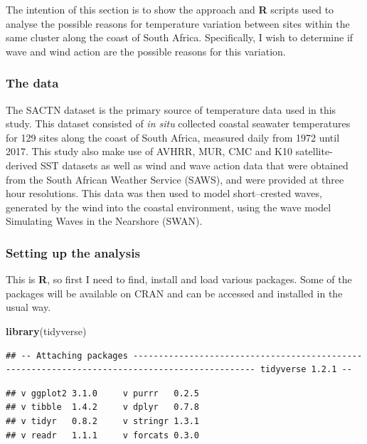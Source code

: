 \documentclass[10pt,A4,]{article}
\newenvironment{Shaded}{\begin{snugshade}}{\end{snugshade}}
\newcommand{\KeywordTok}[1]{\textcolor[rgb]{0.13,0.29,0.53}{\textbf{#1}}}
\newcommand{\NormalTok}[1]{#1}
\begin{document}
The intention of this section is to show the approach and \textbf{R}
scripts used to analyse the possible reasons for temperature variation
between sites within the same cluster along the coast of South Africa.
Specifically, I wish to determine if wave and wind action are the
possible reasons for this variation.

\subsubsection*{The data}

The SACTN dataset is the primary source of temperature data used in this
study. This dataset consisted of \emph{in situ} collected coastal
seawater temperatures for 129 sites along the coast of South Africa,
measured daily from 1972 until 2017. This study also make use of AVHRR,
MUR, CMC and K10 satellite-derived SST datasets as well as wind and wave
action data that were obtained from the South African Weather Service
(SAWS), and were provided at three hour resolutions. This data was then
used to model short--crested waves, generated by the wind into the
coastal environment, using the wave model Simulating Waves in the
Nearshore (SWAN).

\subsubsection*{Setting up the analysis}

This is \textbf{R}, so first I need to find, install and load various
packages. Some of the packages will be available on CRAN and can be
accessed and installed in the usual way.

\begin{Shaded}
\begin{Highlighting}[]
\KeywordTok{library}\NormalTok{(tidyverse)}
\end{Highlighting}
\end{Shaded}

\begin{verbatim}
## -- Attaching packages ---------------------------------------------------------------------------------------------- tidyverse 1.2.1 --
\end{verbatim}

\begin{verbatim}
## v ggplot2 3.1.0     v purrr   0.2.5
## v tibble  1.4.2     v dplyr   0.7.8
## v tidyr   0.8.2     v stringr 1.3.1
## v readr   1.1.1     v forcats 0.3.0
\end{verbatim}
\end{document}

